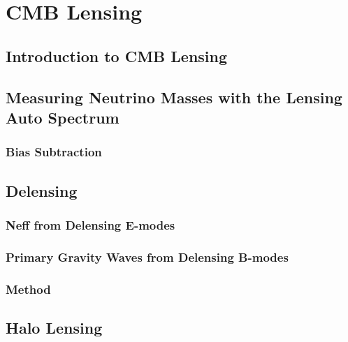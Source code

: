  
\chapter{CMB Lensing}
\renewcommand*\thesection{\arabic{section}}

\def\nnu{N_{\mathrm eff}}
\def\gtrsim{\raise-.75ex\hbox{$\buildrel>\over\sim$}}

\section{Introduction to CMB Lensing}

\section{Measuring Neutrino Masses with the Lensing Auto Spectrum}

\subsection{Bias Subtraction}

\section{Delensing}

\subsection{Neff from Delensing E-modes}

\subsection{Primary Gravity Waves from Delensing B-modes}

\subsection{Method}

\section{Halo Lensing}

